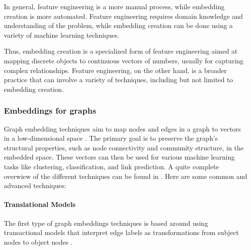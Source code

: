     In general, feature engineering is a more manual process, while embedding creation is more automated. Feature engineering requires domain knowledge and understanding of the problem, while embedding creation can be done using a variety of machine learning techniques.

    Thus, embedding creation is a specialized form of feature engineering aimed at mapping discrete objects to continuous vectors of numbers, usually for capturing complex relationships. Feature engineering, on the other hand, is a broader practice that can involve a variety of techniques, including but not limited to embedding creation.

    \subsubsection{Embeddings for graphs}\label{sec:background:processing:embedding:graph}
    Graph embedding techniques aim to map nodes and edges in a graph to vectors in a low-dimensional space \cite{KG21}. The primary goal is to preserve the graph's structural properties, such as node connectivity and community structure, in the embedded space. These vectors can then be used for various machine learning tasks like clustering, classification, and link prediction. A quite complete overwiew of the different techniques can be found in . Here are some common and advanced techniques:


    \paragraph{Translational Models}
    The first type of graph embeddings techniques is based around using transactional models that interpret edge labels as transformations from subject nodes to object nodes . 


